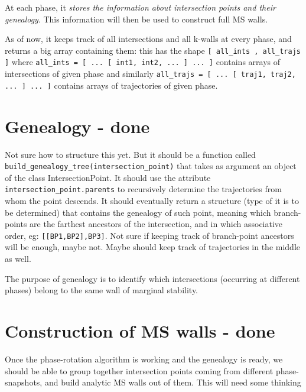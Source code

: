 \documentclass[11pt]{report}
\begin{document}
At each phase, it \emph{stores the information about intersection points and their genealogy}. This information will then be used to construct full MS walls.

As of now, it keeps track of all intersections and all k-walls at every phase, and returns a big array containing them: this has the shape {\tt [  all\_ints , all\_trajs  ]} where {\tt all\_ints = [ ... [ int1, int2, ... ] ... ]} contains arrays of intersections of given phase and similarly {\tt all\_trajs = [ ... [ traj1, traj2, ... ] ... ]} contains arrays of trajectories of given phase.



\section{Genealogy - {\color{red} \bf done}}
Not sure how to structure this yet. But it should be a function called {\tt build\_genealogy\_tree(intersection\_point)} that takes as argument an object of the class IntersectionPoint.
It should use the attribute {\tt intersection\_point.parents} to recursively determine the trajectories from whom the point descends.
It should eventually return a structure (type of it is to be determined) that contains the genealogy of such point, meaning which branch-points are the farthest ancestors of the intersection, and in which associative order, eg: {\tt [[BP1,BP2],BP3]}.
Not sure if keeping track of branch-point ancestors will be enough, maybe not. Maybe should keep track of trajectories in the middle as well.

\medskip

The purpose of genealogy is to identify which intersections (occurring at different phases) belong to the same wall of marginal stability.


\section{Construction of MS walls  - {\color{red} \bf done}}
Once the phase-rotation algorithm is working and the genealogy is ready, we should be able to group together intersection points coming from different phase-snapshots, and build analytic MS walls out of them. This will need some thinking
\end{document}
